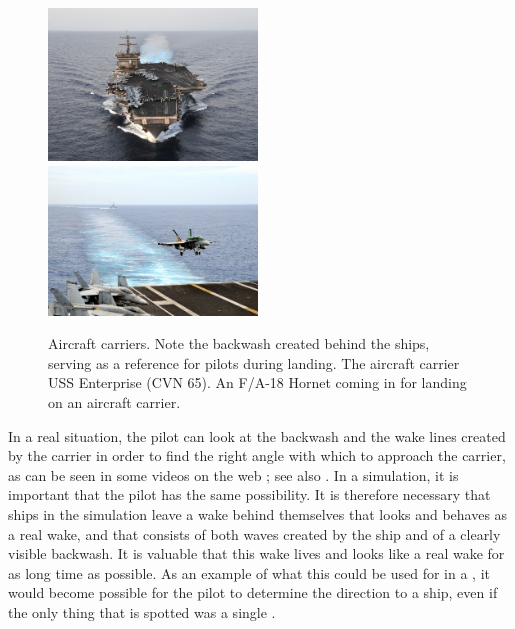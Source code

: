\begin{figure}
    \centering
     {\includegraphics[width=0.495\textwidth]{Images/Public_domain/The_aircraft_carrier_USS_Enterprise_(CVN_65)}}
     {\includegraphics[width=0.495\textwidth]{Images/Public_domain/An_F-A-18C_Hornet_lands_on_the_aircraft_carrier_USS_George_Washington_(CVN_73)}}
    \caption{Aircraft carriers. Note the backwash created behind the ships, serving as a reference for pilots during landing.  The aircraft carrier USS Enterprise (CVN 65).  An F/A-18 Hornet coming in for landing on an aircraft carrier.}
    \label{fig:aircraft_carriers_and_backwash}
\end{figure}

In a real situation, the pilot can look at the backwash and the wake lines created by the carrier in order to find the right angle with which to approach the carrier, as can be seen in some videos on the web \citep{Alivewithpassion2007,MatteoBram2007}; see also . In a simulation, it is important that the pilot has the same possibility. It is therefore necessary that ships in the simulation leave a wake behind themselves that looks and behaves as a real wake, and that consists of both waves created by the ship and of a clearly visible backwash. It is valuable that this wake lives and looks like a real wake for as long time as possible. As an example of what this could be used for in a , it would become possible for the pilot to determine the direction to a ship, even if the only thing that is spotted was a single .